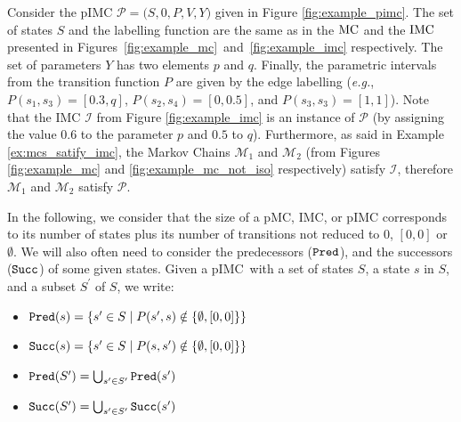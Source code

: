 \documentclass{llncs}
\newcommand{\mc}{\textnormal{MC}}
\newcommand{\imc}{\textnormal{IMC}}
\newcommand{\pimc}{\textnormal{pIMC}}
\newcommand{\pmc}{\textnormal{pMC}}
\newcommand{\eg} {{\em e.g.},\ }
\newcommand{\Succ}{\ensuremath{{\tt{Succ}}}}
\newcommand{\Pred}{\ensuremath{{\tt{Pred}}}}
\begin{document}
\begin{example}
Consider the {\pimc} $\mathcal{P} = (S,$0$,P,V,Y)$ given in Figure \ref{fig:example_pimc}.
The set of states $S$ and the labelling function
are the same as in the ${\mc}$ and the ${\imc}$  presented in Figures~\ref{fig:example_mc}~and~\ref{fig:example_imc} respectively.
The set of parameters $Y$ has two elements $p$ and $q$.
Finally, the parametric intervals from the transition function $P$ 
are given by the edge labelling
(\eg $P(s_1,s_3)=[0.3, q]$, $P(s_2,s_4)=[0,0.5]$, and $P(s_3,s_3)=[1,1]$).
Note that the {\imc} $\mathcal{I}$ from Figure \ref{fig:example_imc} 
is an instance of $\mathcal{P}$
(by assigning the value $0.6$ to the parameter $p$ and $0.5$ to  $q$).
Furthermore, as said in Example \ref{ex:mcs_satify_imc}, 
the Markov Chains $\mathcal{M}_1$ and $\mathcal{M}_2$ (from Figures \ref{fig:example_mc} and \ref{fig:example_mc_not_iso} respectively)
satisfy $\mathcal{I}$, therefore $\mathcal{M}_1$ and $\mathcal{M}_2$ satisfy $\mathcal{P}$.
\end{example}

In the following, we consider that the size of a {\pmc}, {\imc}, or {\pimc}
corresponds to its number of states plus its number of transitions not reduced to $0$, $[0,0]$ or $\emptyset$.
We will also often need to consider the predecessors (\Pred), 
and the successors (\Succ) of some given states.
Given a \pimc\ with a set of states $S$, a state $s$ in $S$, and a subset $S^\prime$ of $S$, we write:

\smallskip
\begin{minipage}{\textwidth}
  \hspace{-.8cm}
  \begin{minipage}{.58\textwidth}
    \begin{itemize}
	\item { $\Pred(s) = \{s^\prime \in S \mid P(s^\prime, s)
          \notin \{\emptyset, [0, 0]\}\}$}
	\item { $\Succ(s) = \{s^\prime \in S \mid P(s,
          s^\prime) \notin \{\emptyset, [0,
            0] \}\}$}
    \end{itemize}
  \end{minipage}
  \begin{minipage}{.41\textwidth}
    \begin{itemize}
      \item { $\Pred(S^\prime) = \bigcup_{s^\prime \in
          S^\prime} \Pred(s^\prime)$}
      \item { $\Succ(S^\prime) = \bigcup_{s^\prime \in S^\prime}
        \Succ(s^\prime)$}
    \end{itemize}
  \end{minipage}  
\end{minipage}
\end{document}
